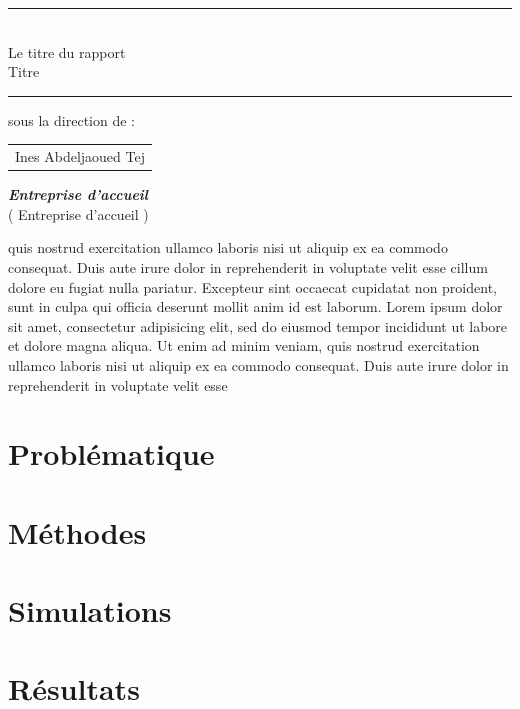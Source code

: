 \documentclass{article}
\newcommand{\reportSubject} {%
  Le titre du rapport \\ Titre%
}
\newcommand{\studyDepartment} {%
  Entreprise d'accueil %
}
\begin{document}
\begin{titlepage}
\begin{center}
\vspace{10pt} {%
  \renewcommand*{\familydefault}{\defaultFont}
  \fontsize{27pt}{27pt}\selectfont%
  \rule{0.5\textwidth}{.4pt}\\
  \vspace{10pt}
  \reportSubject{}\\%
  \vspace{10pt}
  \rule{0.5\textwidth}{.4pt}
}

\vspace{10pt}
sous la direction de :\\
\vspace{20pt}
\begin{tabular}{c} Ines Abdeljaoued Tej \\
\end{tabular}

\vspace{30pt}%
\textbf{\textit{Entreprise d'accueil}}\\

\vspace{10pt}
(\studyDepartment)\\
\end{center}
\end{titlepage}


\tableofcontents

\vspace{6cm}

quis nostrud exercitation ullamco laboris nisi ut aliquip ex ea commodo
consequat. Duis aute irure dolor in reprehenderit in voluptate velit esse
cillum dolore eu fugiat nulla pariatur. Excepteur sint occaecat cupidatat non
proident, sunt in culpa qui officia deserunt mollit anim id est laborum. Lorem ipsum dolor sit amet, consectetur adipisicing elit, sed do eiusmod
tempor incididunt ut labore et dolore magna aliqua. Ut enim ad minim veniam,
quis nostrud exercitation ullamco laboris nisi ut aliquip ex ea commodo
consequat. Duis aute irure dolor in reprehenderit in voluptate velit esse

\section{Problématique}
\section{Méthodes}
\section{Simulations}
\section{Résultats}



\end{document}
